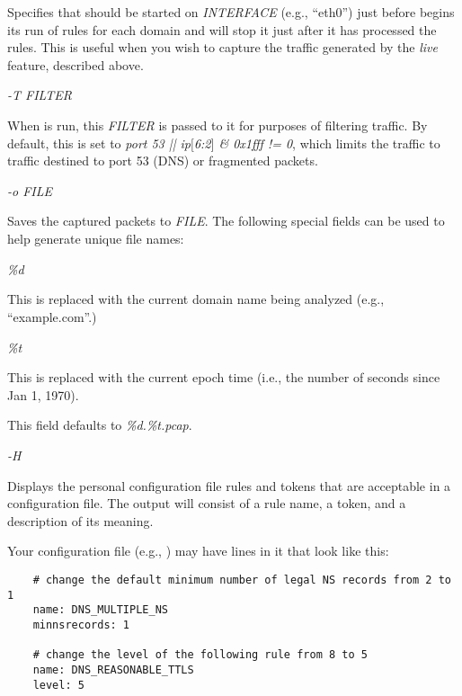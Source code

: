 \begin{description}
Specifies that  should be started on {\it INTERFACE} (e.g.,
``eth0'') just before  begins its run of rules for each domain
and will stop it just after it has processed the rules.  This is
useful when you wish to capture the traffic generated by the {\it live}
feature, described above.

\item {\it -T FILTER}\verb" "

When  is run, this {\it FILTER} is passed to it for purposes of
filtering traffic.  By default, this is set to {\it port 53 || ip$[$6:2$]$ \&
0x1fff != 0}, which limits the traffic to traffic destined to port 53
(DNS) or fragmented packets.

\item {\it -o FILE}\verb" "

Saves the  captured packets to {\it FILE}.  The following
special fields can be used to help generate unique file names:

\begin{description}

\item {\it \%d}\verb" "

This is replaced with the current domain name being analyzed (e.g.,
``example.com''.)

\item {\it \%t}\verb" "

This is replaced with the current epoch time (i.e., the number of
seconds since Jan 1, 1970).

\end{description}

This field defaults to {\it \%d.\%t.pcap}.

\item {\it -H}\verb" "

Displays the personal configuration file rules and tokens that are acceptable
in a configuration file.  The output will consist of a rule name, a token, and
a description of its meaning.

Your configuration file (e.g., ) may have lines in
it that look like this:

\begin{verbatim}
    # change the default minimum number of legal NS records from 2 to 1
    name: DNS_MULTIPLE_NS
    minnsrecords: 1

    # change the level of the following rule from 8 to 5
    name: DNS_REASONABLE_TTLS
    level: 5
\end{verbatim}


\end{description}
